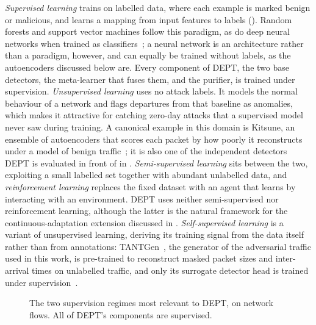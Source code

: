 \emph{Supervised learning} trains on labelled data, where each example is marked benign or
malicious, and learns a mapping from input features to labels ().
Random forests and support vector machines follow this paradigm, as do deep neural networks
when trained as classifiers~\cite{boutaba2018comprehensive,sarker2021deep}; a neural
network is an architecture rather than a paradigm, however, and can equally be trained
without labels, as the autoencoders discussed below are. Every component of DEPT, the
two base detectors, the meta-learner that fuses them, and the purifier, is trained under
supervision. \emph{Unsupervised learning} uses no attack labels. It models
the normal behaviour of a network and flags departures from that baseline as anomalies,
which makes it attractive for catching zero-day attacks that a supervised model never saw
during training. A canonical example in this domain is Kitsune, an ensemble of
autoencoders that scores each packet by how poorly it reconstructs under a model of benign
traffic~\cite{mirsky2018kitsune}; it is also one of the independent detectors DEPT is
evaluated in front of in . \emph{Semi-supervised learning} sits between the two,
exploiting a small labelled set together with abundant unlabelled data, and
\emph{reinforcement learning} replaces the fixed dataset with an agent that learns by
interacting with an environment. DEPT uses neither semi-supervised nor reinforcement
learning, although the latter is the natural framework for the continuous-adaptation extension discussed in
.
\emph{Self-supervised learning} is a variant of unsupervised learning, deriving its
training signal from the data itself rather than from annotations: TANTGen~\cite{pissarra2026tantgen}, the generator of
the adversarial traffic used in this work, is pre-trained to reconstruct masked packet sizes and inter-arrival
times on unlabelled traffic, and only its surrogate detector head is trained under
supervision~\cite{pissarra2026tantgen}.

\begin{figure}[htbp]
    \centering
    \hfill
    \caption[The two supervision regimes most relevant to DEPT.]{The two supervision regimes most relevant to DEPT, on network flows. All of DEPT's components are supervised.}
    \label{fig:bg-paradigms}
\end{figure}

